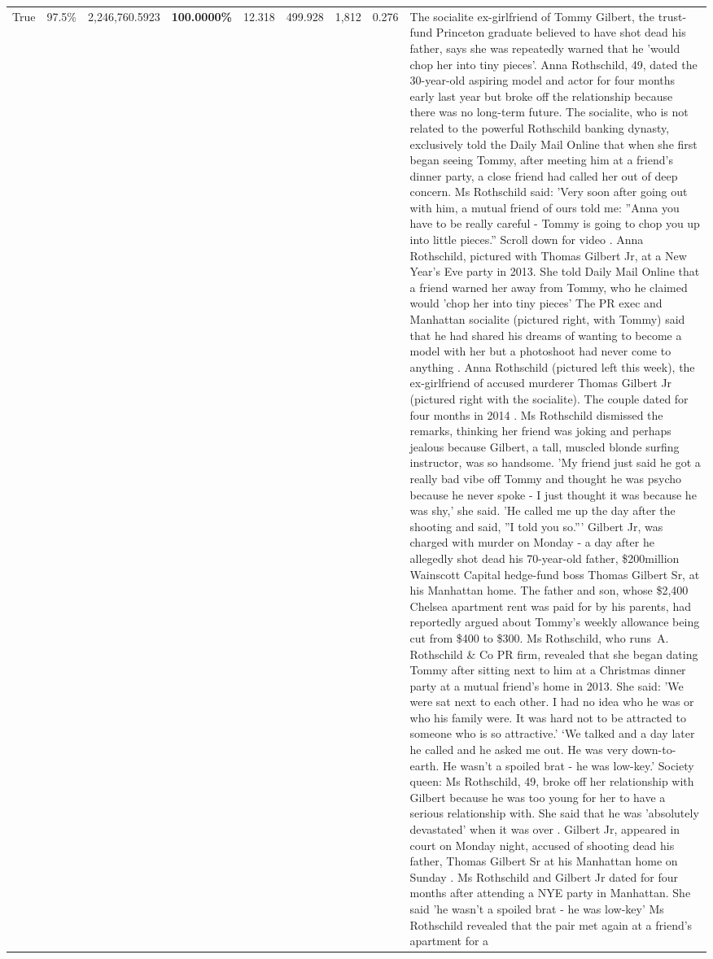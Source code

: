 \begin{table}[H]
\begin{tabular}{lllrlllll}
True & 97.5\% & 2,246,760.5923 & \bfseries \color{red} 100.0000\% & 12.318 & 499.928 & 1,812 & 0.276 & The socialite ex-girlfriend of Tommy Gilbert, the trust-fund Princeton graduate believed to have shot dead his father, says she was repeatedly warned that he 'would chop her into tiny pieces'. Anna Rothschild, 49, dated the 30-year-old aspiring model and actor for four months early last year but broke off the relationship because there was no long-term future. The socialite, who is not related to the powerful Rothschild banking dynasty, exclusively told the Daily Mail Online that when she first began seeing Tommy, after meeting him at a friend's dinner party, a close friend had called her out of deep concern. Ms Rothschild said: 'Very soon after going out with him, a mutual friend of ours told me: ''Anna you have to be really careful - Tommy is going to chop you up into little pieces.'' Scroll down for video . Anna Rothschild, pictured with Thomas Gilbert Jr, at a New Year's Eve party in 2013. She told Daily Mail Online that a friend warned her away from Tommy, who he claimed would 'chop her into tiny pieces' The PR exec and Manhattan socialite (pictured right, with Tommy) said that he had shared his dreams of wanting to become a model with her but a photoshoot had never come to anything . Anna Rothschild (pictured left this week), the ex-girlfriend of accused murderer Thomas Gilbert Jr (pictured right with the socialite). The couple dated for four months in 2014 . Ms Rothschild dismissed the remarks, thinking her friend was joking and perhaps jealous because Gilbert, a tall, muscled blonde surfing instructor, was so handsome. 'My friend just said he got a really bad vibe off Tommy and thought he was psycho because he never spoke - I just thought it was because he was shy,' she said. 'He called me up the day after the shooting and said, ''I told you so.''' Gilbert Jr, was charged with murder on Monday - a day after he allegedly shot dead his 70-year-old father, \$200million Wainscott Capital hedge-fund boss Thomas Gilbert Sr, at his Manhattan home. The father and son, whose \$2,400 Chelsea apartment rent was paid for by his parents, had reportedly argued about Tommy's weekly allowance being cut from \$400 to \$300. Ms Rothschild, who runs A. Rothschild \& Co PR firm, revealed that she began dating Tommy after sitting next to him at a Christmas dinner party at a mutual friend's home in 2013. She said: 'We were sat next to each other. I had no idea who he was or who his family were. It was hard not to be attracted to someone who is so attractive.' ‘We talked and a day later he called and he asked me out. He was very down-to-earth. He wasn’t a spoiled brat - he was low-key.’ Society queen: Ms Rothschild, 49, broke off her relationship with Gilbert because he was too young for her to have a serious relationship with. She said that he was 'absolutely devastated' when it was over . Gilbert Jr, appeared in court on Monday night, accused of shooting dead his father, Thomas Gilbert Sr at his Manhattan home on Sunday . Ms Rothschild and Gilbert Jr dated for four months after attending a NYE party in Manhattan. She said 'he wasn't a spoiled brat - he was low-key' Ms Rothschild revealed that the pair met again at a friend’s apartment for a 
\end{tabular}
\end{table}
